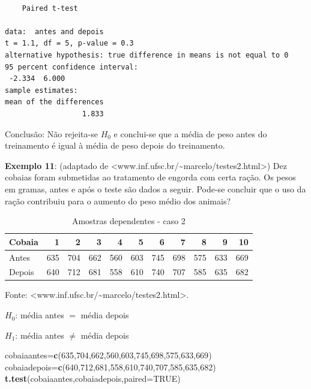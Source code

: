 \documentclass[12pt,brazil,oneside]{book}
\newenvironment{Shaded}{\begin{snugshade}}{\end{snugshade}}
\newcommand{\DataTypeTok}[1]{\textcolor[rgb]{0.13,0.29,0.53}{#1}}
\newcommand{\DecValTok}[1]{\textcolor[rgb]{0.00,0.00,0.81}{#1}}
\newcommand{\KeywordTok}[1]{\textcolor[rgb]{0.13,0.29,0.53}{\textbf{#1}}}
\newcommand{\NormalTok}[1]{#1}
\newcommand{\OtherTok}[1]{\textcolor[rgb]{0.56,0.35,0.01}{#1}}
\begin{document}
\begin{verbatim}

    Paired t-test

data:  antes and depois
t = 1.1, df = 5, p-value = 0.3
alternative hypothesis: true difference in means is not equal to 0
95 percent confidence interval:
 -2.334  6.000
sample estimates:
mean of the differences 
                  1.833 
\end{verbatim}

Conclusão: Não rejeita-se \(H_0\) e conclui-se que a média de peso antes do treinamento é igual à média de peso depois do treinamento.

\textbf{Exemplo 11}: (adaptado de \textless{}www.inf.ufsc.br/\textasciitilde{}marcelo/testes2.html\textgreater{}) Dez cobaias foram submetidas ao tratamento de engorda com certa ração. Os pesos em gramas, antes e após o teste são dados a seguir. Pode-se concluir que o uso da ração contribuiu para o aumento do peso médio dos animais?

\begin{table}[t]

\caption{\label{tab:unnamed-chunk-149}Amostras dependentes - caso 2}
\centering
\begin{tabular}{l|r|r|r|r|r|r|r|r|r|r}
\hline
Cobaia & 1 & 2 & 3 & 4 & 5 & 6 & 7 & 8 & 9 & 10\\
\hline
Antes & 635 & 704 & 662 & 560 & 603 & 745 & 698 & 575 & 633 & 669\\
\hline
Depois & 640 & 712 & 681 & 558 & 610 & 740 & 707 & 585 & 635 & 682\\
\hline
\end{tabular}
\end{table}

Fonte: \textless{}www.inf.ufsc.br/\textasciitilde{}marcelo/testes2.html\textgreater{}.

\textbf{\(H_0\)}: média antes \(=\) média depois

\textbf{\(H_1\)}: média antes \(\neq\) média depois

\begin{Shaded}
\begin{Highlighting}[]
\NormalTok{cobaiaantes=}\KeywordTok{c}\NormalTok{(}\DecValTok{635}\NormalTok{,}\DecValTok{704}\NormalTok{,}\DecValTok{662}\NormalTok{,}\DecValTok{560}\NormalTok{,}\DecValTok{603}\NormalTok{,}\DecValTok{745}\NormalTok{,}\DecValTok{698}\NormalTok{,}\DecValTok{575}\NormalTok{,}\DecValTok{633}\NormalTok{,}\DecValTok{669}\NormalTok{)}
\NormalTok{cobaiadepois=}\KeywordTok{c}\NormalTok{(}\DecValTok{640}\NormalTok{,}\DecValTok{712}\NormalTok{,}\DecValTok{681}\NormalTok{,}\DecValTok{558}\NormalTok{,}\DecValTok{610}\NormalTok{,}\DecValTok{740}\NormalTok{,}\DecValTok{707}\NormalTok{,}\DecValTok{585}\NormalTok{,}\DecValTok{635}\NormalTok{,}\DecValTok{682}\NormalTok{)}
\KeywordTok{t.test}\NormalTok{(cobaiaantes,cobaiadepois,}\DataTypeTok{paired=}\OtherTok{TRUE}\NormalTok{)}
\end{Highlighting}
\end{Shaded}
\end{document}
